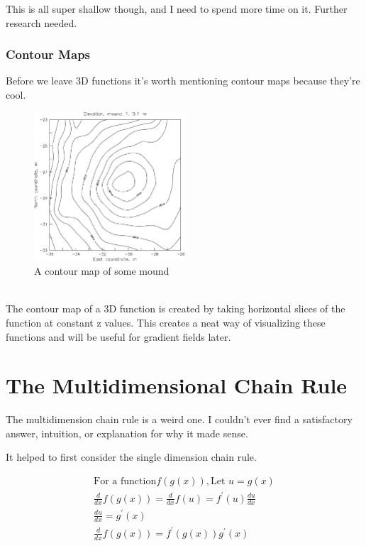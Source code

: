 \documentclass[12pt, letterpaper]{article}
\begin{document}
This is all super shallow though, and I need to spend more time on it. Further research needed.
\subsubsection{Contour Maps}
\label{sssec:Contour Maps}
Before we leave 3D functions it's worth mentioning contour maps because they're cool.\\
\begin{figure}[h]
    \centering 
    \includegraphics[width=0.5\textwidth]{contourmap}
    \caption{A contour map of some mound}
\end{figure}\\
The contour map of a 3D function is created by taking horizontal slices of the function at constant z values. This creates a neat way of visualizing these functions and will be useful for gradient fields later.

\newpage

\section{The Multidimensional Chain Rule}

The multidimension chain rule is a weird one. I couldn't ever find a satisfactory answer, intuition, or explanation for why it made sense.

It helped to first consider the single dimension chain rule.

\begin{gather*}
    \text{For a function} f(g(x)), \text{Let } u = g(x) \\
    \frac{d}{dx} f(g(x)) = \frac{d}{dx} f(u) = f^\prime (u)\frac{du}{dx}\\
    \frac{du}{dx} = g^\prime (x)\\
    \frac{d}{dx} f(g(x)) = f^\prime (g(x)) g^\prime (x)
\end{gather*}
\end{document}
